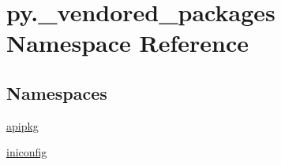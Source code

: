 \hypertarget{namespacepy_1_1__vendored__packages}{}\section{py.\+\_\+vendored\+\_\+packages Namespace Reference}
\label{namespacepy_1_1__vendored__packages}
\subsection*{Namespaces}
\begin{DoxyCompactItemize}
\item 
 \hyperlink{namespacepy_1_1__vendored__packages_1_1apipkg}{apipkg}
\item 
 \hyperlink{namespacepy_1_1__vendored__packages_1_1iniconfig}{iniconfig}
\end{DoxyCompactItemize}
